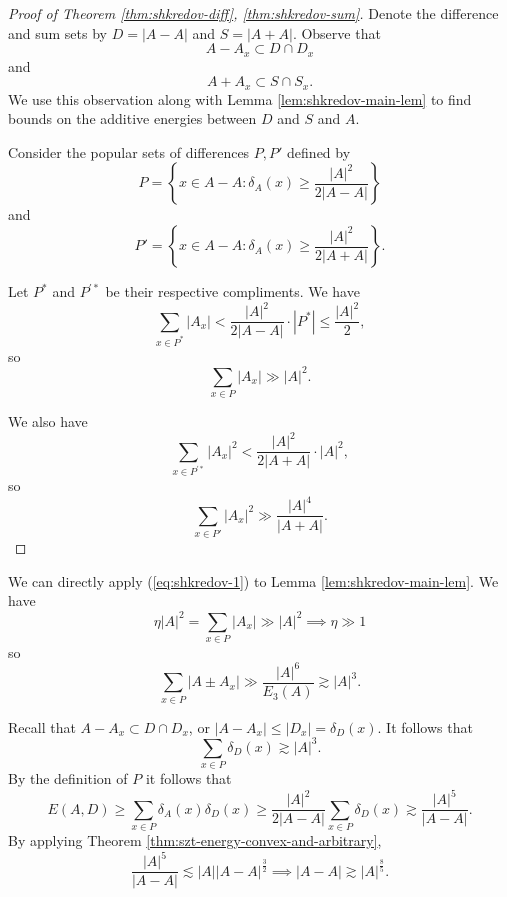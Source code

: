 \documentclass[12pt,reqno]{amsart}
\begin{document}
\begin{proof}[Proof of Theorem \ref{thm:shkredov-diff}, \ref{thm:shkredov-sum}]
Denote the difference and sum sets by \(D = \left\lvert A-A \right\rvert \) and \(S = \left\lvert A+A \right\rvert \).
Observe that
\[
    A - A_{x} \subset D \cap D_{x} 
\]
and
\[
    A + A_{x} \subset S \cap S_{x} 
.\]
We use this observation along with Lemma \ref{lem:shkredov-main-lem} to find bounds on
the additive energies between \(D\) and \(S\) and \(A\).

Consider the popular sets of differences \(P,P'\) defined by
\[
    P = \left\{ x \in A - A : \delta_{A} (x) \geq \frac{\left\lvert A \right\rvert ^{2}}{2 \left\lvert A-A \right\rvert }  \right\} 
\]
and
\[
    P ' = \left\{ x \in A-A : \delta_{A} (x) \geq \frac{\left\lvert A \right\rvert ^{2}}{2\left\lvert A + A \right\rvert }  \right\} 
.\]

Let \(P^{*}\) and \(P^{'*}\) be their respective compliments. We have
\[
    \sum _{x \in P^{*}} \left\lvert A_{x} \right\rvert < \frac{\left\lvert A \right\rvert ^{2}}{2 \left\lvert A-A \right\rvert } \cdot  \left\lvert P^{*} \right\rvert \leq \frac{\left\lvert A \right\rvert ^{2}}{2} 
,\]
so
\begin{equation} \label{eq:shkredov-1}
    \sum _{x \in P} \left\lvert A_{x}  \right\rvert \gg \left\lvert A \right\rvert ^{2}
    .
\end{equation}

We also have
\[
    \sum _{x \in P ^{'*}} \left\lvert A_{x}  \right\rvert ^{2} < \frac{\left\lvert A \right\rvert ^{2}}{2 \left\lvert A+A \right\rvert } \cdot \left\lvert A \right\rvert ^{2}
,\]
so
\[
    \sum _{x \in P'} \left\lvert A_{x}  \right\rvert ^{2} \gg \frac{\left\lvert A \right\rvert ^{4}}{\left\lvert A+A \right\rvert } 
.\]
\end{proof}

We can directly apply (\ref{eq:shkredov-1}) to Lemma \ref{lem:shkredov-main-lem}. We have
\[
    \eta \left\lvert A \right\rvert ^{2} = \sum _{x \in P} \left\lvert A_{x}  \right\rvert \gg \left\lvert A \right\rvert ^{2} \implies \eta \gg 1
\]
so
\[
    \sum _{x \in P} \left\lvert A \pm  A_{x}  \right\rvert \gg \frac{\left\lvert A \right\rvert ^{6}}{E_{3} (A)} \gtrsim \left\lvert A \right\rvert ^{3}
.\]

Recall that \(A - A_{x} \subset D \cap D_{x} \), or \(\left\lvert A - A_{x}  \right\rvert \leq \left\lvert D_{x}  \right\rvert = \delta_{D} (x)\). It follows that
\[
    \sum _{x \in P} \delta_{D} (x) \gtrsim \left\lvert A \right\rvert ^{3}
.\]
By the definition of \(P\) it follows that
\[
    E(A,D) \geq \sum _{x \in P} \delta_{A} (x)\delta_{D} (x) \geq \frac{\left\lvert A \right\rvert ^{2}}{2 \left\lvert A-A \right\rvert } \sum _{x \in P} \delta_{D} (x) \gtrsim \frac{\left\lvert A \right\rvert ^{5}}{\left\lvert A-A \right\rvert }
.\]
By applying Theorem \ref{thm:szt-energy-convex-and-arbitrary},
\[
    \frac{\left\lvert A \right\rvert ^{5}}{\left\lvert A-A \right\rvert } \lesssim \left\lvert A \right\rvert \left\lvert A-A \right\rvert ^{\frac{3}{2} } \implies \left\lvert A-A \right\rvert \gtrsim \left\lvert A \right\rvert ^{\frac{8}{5} }
.\]
\end{document}
